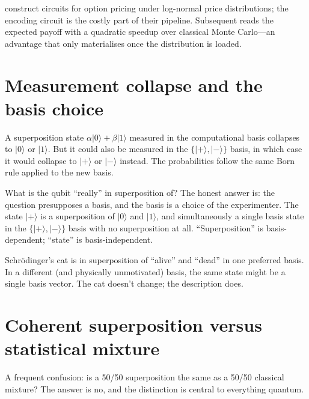\citet{stamatopoulos_option_2020} construct circuits for option pricing under log-normal price distributions; the encoding circuit is the costly part of their pipeline. Subsequent  reads the expected payoff with a quadratic speedup over classical Monte Carlo---an advantage that only materialises once the distribution is loaded.

\section{Measurement collapse and the basis choice}

A superposition state $\alpha|0\rangle + \beta|1\rangle$ measured in the computational basis collapses to $|0\rangle$ or $|1\rangle$. But it could also be measured in the $\{|+\rangle, |-\rangle\}$ basis, in which case it would collapse to $|+\rangle$ or $|-\rangle$ instead. The probabilities follow the same Born rule applied to the new basis.

What is the qubit ``really'' in superposition of? The honest answer is: the question presupposes a basis, and the basis is a choice of the experimenter. The state $|+\rangle$ is a superposition of $|0\rangle$ and $|1\rangle$, and simultaneously a single basis state in the $\{|+\rangle,|-\rangle\}$ basis with no superposition at all. ``Superposition'' is basis-dependent; ``state'' is basis-independent.

\begin{example}
Schr\"odinger's cat is in superposition of ``alive'' and ``dead'' in one preferred basis. In a different (and physically unmotivated) basis, the same state might be a single basis vector. The cat doesn't change; the description does.
\end{example}

\section{Coherent superposition versus statistical mixture}

A frequent confusion: is a 50/50 superposition the same as a 50/50 classical mixture? The answer is no, and the distinction is central to everything quantum.

